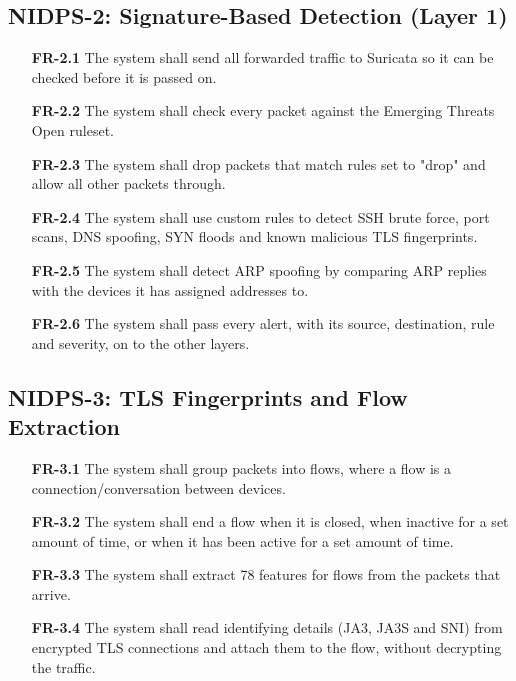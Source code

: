 \subsection{NIDPS-2: Signature-Based Detection (Layer 1)}\label{sec:4.2.2}

\begin{itemize}[leftmargin=4.4em,labelwidth=3.9em,labelsep=0.5em,align=left]
\item[\hypertarget{req:FR-2.1}{\textbf{FR-2.1}}] The system shall send all forwarded traffic to Suricata so it can be checked before it is passed on.
\item[\hypertarget{req:FR-2.2}{\textbf{FR-2.2}}] The system shall check every packet against the Emerging Threats Open ruleset.
\item[\hypertarget{req:FR-2.3}{\textbf{FR-2.3}}] The system shall drop packets that match rules set to "drop" and allow all other packets through.
\item[\hypertarget{req:FR-2.4}{\textbf{FR-2.4}}] The system shall use custom rules to detect SSH brute force, port scans, DNS spoofing, SYN floods and known malicious TLS fingerprints.
\item[\hypertarget{req:FR-2.5}{\textbf{FR-2.5}}] The system shall detect ARP spoofing by comparing ARP replies with the devices it has assigned addresses to.
\item[\hypertarget{req:FR-2.6}{\textbf{FR-2.6}}] The system shall pass every alert, with its source, destination, rule and severity, on to the other layers.
\end{itemize}

\subsection{NIDPS-3: TLS Fingerprints and Flow Extraction}\label{sec:4.2.3}

\begin{itemize}[leftmargin=4.4em,labelwidth=3.9em,labelsep=0.5em,align=left]
\item[\hypertarget{req:FR-3.1}{\textbf{FR-3.1}}] The system shall group packets into flows, where a flow is a connection/conversation between devices.
\item[\hypertarget{req:FR-3.2}{\textbf{FR-3.2}}] The system shall end a flow when it is closed, when inactive for a set amount of time, or when it has been active for a set amount of time.
\item[\hypertarget{req:FR-3.3}{\textbf{FR-3.3}}] The system shall extract 78 features for flows from the packets that arrive.
\item[\hypertarget{req:FR-3.4}{\textbf{FR-3.4}}] The system shall read identifying details (JA3, JA3S and SNI) from encrypted TLS connections and attach them to the flow, without decrypting the traffic.
\end{itemize}

